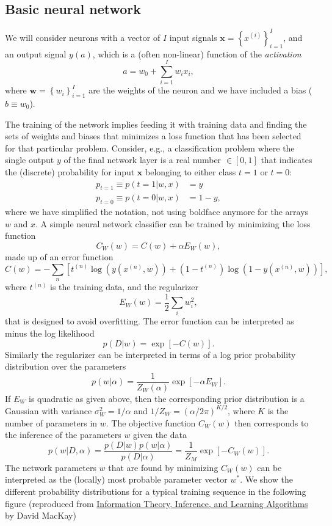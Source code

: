 \documentclass[%
oneside,                 %
final,                   %
10pt]{article}
\begin{document}
\noindent
\subsection{Basic neural network}
We will consider neurons with a vector of $I$ input signals $\mathbf{x} = \left\{ x^{(i)} \right\}_{i=1}^I$, and an output signal $y(a)$, which is a (often non-linear) function of the \emph{activation}
\[ a = w_0 +  \sum_{i=1}^I w_i x_i, \]
where $\mathbf{w} = \left\{ w_i \right\}_{i=1}^I$ are the weights of the neuron and we have included a bias ($b \equiv w_0$).

The training of the network implies feeding it with training data and finding the sets of weights and biases that minimizes a loss function that has been selected for that particular problem.
Consider, e.g., a classification problem where the single output $y$ of the final network layer is a real number $\in [0,1]$ that indicates the (discrete) probability for input $\mathbf{x}$ belonging to either class $t=1$ or $t=0$:
\begin{align}
p_{t=1} \equiv p(t=1 | w,x) &= y \\
p_{t=0} \equiv p(t=0 | w,x) &= 1-y,
\end{align}
where we have simplified the notation, not using boldface anymore for the arrays $w$ and $x$.
A simple neural network classifier can be trained by minimizing the loss function
\[ C_W(w) = C(w) +  \alpha E_W(w), \]
made up of an error function
\[ C(w) = -\sum_n \left[ t^{(n)} \log ( y(x^{(n)},w)) + (1 - t^{(n)}) \log (1 - y(x^{(n)},w)) \right], \]
where $t^{(n)}$ is the training data, and the regularizer
\[ E_W(w) = \frac{1}{2} \sum_i w_i^2, \]
that is designed to avoid overfitting.
The error function can be interpreted as minus the log likelihood
\[ p(D|w) = \exp\left[ - C(w) \right]. \]
Similarly the regularizer can be interpreted in terms of a log prior probability distribution over the parameters
\[ p(w | \alpha) = \frac{1}{Z_W(\alpha)} \exp \left[ -\alpha E_W \right]. \]
If $E_W$ is quadratic as given above, then the corresponding prior distribution is a Gaussian with variance $\sigma_W^2 = 1/\alpha$ and $1/Z_W = (\alpha/2\pi)^{K/2}$, where $K$ is the number of parameters in $w$.
The objective function $C_W(w)$ then corresponds to the inference of the parameters $w$ given the data
\[ p(w | D, \alpha) = \frac{p(D|w) p(w|\alpha)}{p(D|\alpha)} = \frac{1}{Z_M} \exp [ -C_W(w) ]. \]
The network parameters $w$ that are found by minimizing $C_W(w)$ can be interpreted as the (locally) most probable parameter vector $w^*$. We show the different probability distributions for a typical training sequence in the following figure (reproduced from \href{{http://www.inference.org.uk/mackay/itila/}}{Information Theory, Inference, and Learning Algorithms} by David MacKay)
\end{document}
